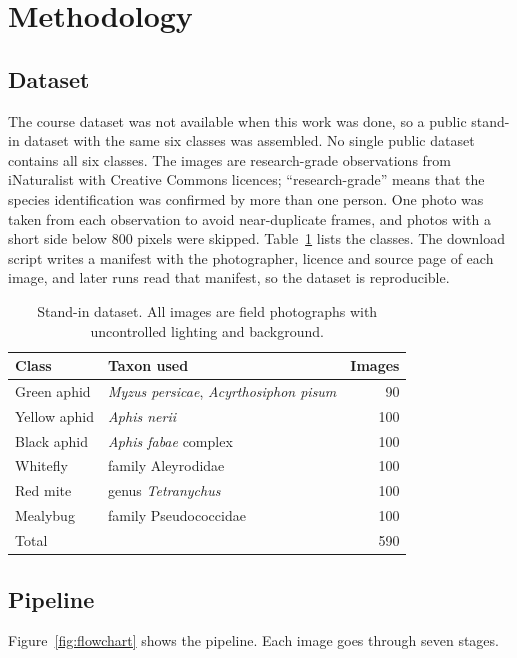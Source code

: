 \section{Methodology}
\label{sec:method}

\subsection{Dataset}
The course dataset was not available when this work was done, so a public stand-in dataset with the same six classes was assembled. No single public dataset contains all six classes. The images are research-grade observations from iNaturalist \cite{inaturalist} with Creative Commons licences; ``research-grade'' means that the species identification was confirmed by more than one person. One photo was taken from each observation to avoid near-duplicate frames, and photos with a short side below 800 pixels were skipped. Table~\ref{tab:dataset} lists the classes. The download script writes a manifest with the photographer, licence and source page of each image, and later runs read that manifest, so the dataset is reproducible.

\begin{table}[H]
\centering
\caption{Stand-in dataset. All images are field photographs with uncontrolled lighting and background.}
\label{tab:dataset}
\begin{tabular}{llr}
\toprule
Class & Taxon used & Images \\
\midrule
Green aphid  & \textit{Myzus persicae}, \textit{Acyrthosiphon pisum} & 90 \\
Yellow aphid & \textit{Aphis nerii} & 100 \\
Black aphid  & \textit{Aphis fabae} complex & 100 \\
Whitefly     & family Aleyrodidae & 100 \\
Red mite     & genus \textit{Tetranychus} & 100 \\
Mealybug     & family Pseudococcidae & 100 \\
\midrule
Total & & 590 \\
\bottomrule
\end{tabular}
\end{table}

\subsection{Pipeline}
Figure~\ref{fig:flowchart} shows the pipeline. Each image goes through seven stages.

